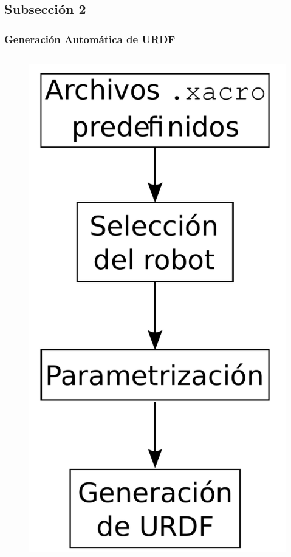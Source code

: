 \documentclass{beamer}
\begin{document}
\subsection{Subsección 2}
\begin{frame}[fragile]
	\frametitle{Generación Automática de URDF}
	
	\begin{columns}[c]
		\begin{figure}[htb]
			\centering
			\includegraphics[width = 0.8\linewidth]{imagenes/generacion_automatica.pdf}
		\end{figure}


\end{columns}
\end{frame}
\end{document}
